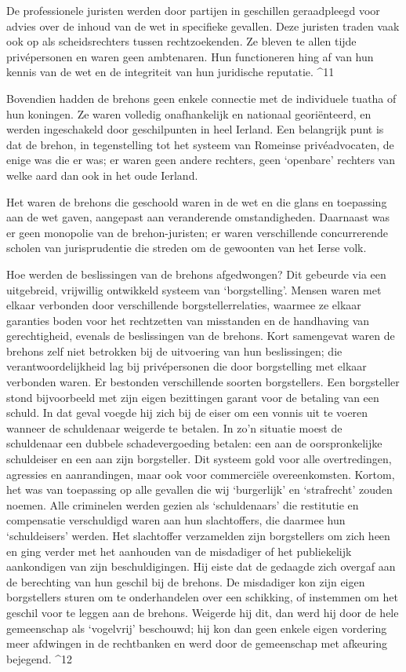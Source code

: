 \documentclass[
  a5paper,
  smalldemyvopaper,10pt,twoside,onecolumn,openright,extrafontsizes,hidelinks]{memoir}
\renewenvironment{quote}%
               {\list{}{\rightmargin=.6cm\leftmargin=.6cm}%
                \itshape \item[]}%
               {\endlist}
\begin{document}
\begin{quote}
De professionele juristen werden door partijen in geschillen
geraadpleegd voor advies over de inhoud van de wet in specifieke
gevallen. Deze juristen traden vaak ook op als scheidsrechters tussen
rechtzoekenden. Ze bleven te allen tijde privépersonen en waren geen
ambtenaren. Hun functioneren hing af van hun kennis van de wet en de
integriteit van hun juridische reputatie. \^{}11
\end{quote}

Bovendien hadden de brehons geen enkele connectie met de individuele
tuatha of hun koningen. Ze waren volledig onafhankelijk en nationaal
georiënteerd, en werden ingeschakeld door geschilpunten in heel Ierland.
Een belangrijk punt is dat de brehon, in tegenstelling tot het systeem
van Romeinse privéadvocaten, de enige was die er was; er waren geen
andere rechters, geen `openbare' rechters van welke aard dan ook in het
oude Ierland.

Het waren de brehons die geschoold waren in de wet en die glans en
toepassing aan de wet gaven, aangepast aan veranderende omstandigheden.
Daarnaast was er geen monopolie van de brehon-juristen; er waren
verschillende concurrerende scholen van jurisprudentie die streden om de
gewoonten van het Ierse volk.

Hoe werden de beslissingen van de brehons afgedwongen? Dit gebeurde via
een uitgebreid, vrijwillig ontwikkeld systeem van `borgstelling'. Mensen
waren met elkaar verbonden door verschillende borgstellerrelaties,
waarmee ze elkaar garanties boden voor het rechtzetten van misstanden en
de handhaving van gerechtigheid, evenals de beslissingen van de brehons.
Kort samengevat waren de brehons zelf niet betrokken bij de uitvoering
van hun beslissingen; die verantwoordelijkheid lag bij privépersonen die
door borgstelling met elkaar verbonden waren. Er bestonden verschillende
soorten borgstellers. Een borgsteller stond bijvoorbeeld met zijn eigen
bezittingen garant voor de betaling van een schuld. In dat geval voegde
hij zich bij de eiser om een vonnis uit te voeren wanneer de schuldenaar
weigerde te betalen. In zo'n situatie moest de schuldenaar een dubbele
schadevergoeding betalen: een aan de oorspronkelijke schuldeiser en een
aan zijn borgsteller. Dit systeem gold voor alle overtredingen,
agressies en aanrandingen, maar ook voor commerciële overeenkomsten.
Kortom, het was van toepassing op alle gevallen die wij `burgerlijk' en
`strafrecht' zouden noemen. Alle criminelen werden gezien als
`schuldenaars' die restitutie en compensatie verschuldigd waren aan hun
slachtoffers, die daarmee hun `schuldeisers' werden. Het slachtoffer
verzamelden zijn borgstellers om zich heen en ging verder met het
aanhouden van de misdadiger of het publiekelijk aankondigen van zijn
beschuldigingen. Hij eiste dat de gedaagde zich overgaf aan de
berechting van hun geschil bij de brehons. De misdadiger kon zijn eigen
borgstellers sturen om te onderhandelen over een schikking, of instemmen
om het geschil voor te leggen aan de brehons. Weigerde hij dit, dan werd
hij door de hele gemeenschap als `vogelvrij' beschouwd; hij kon dan geen
enkele eigen vordering meer afdwingen in de rechtbanken en werd door de
gemeenschap met afkeuring bejegend. \^{}12
\end{document}

